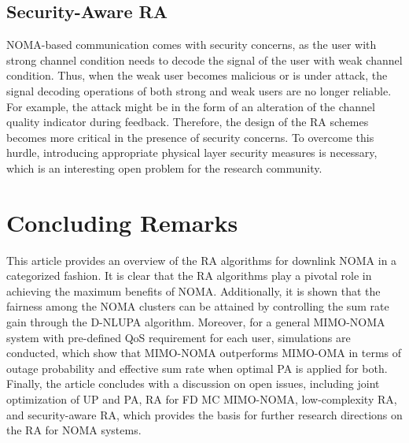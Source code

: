 \documentclass[10pt,final,journal,a4paper,twoside,twocolumn,romanappendices]{IEEEtran}
\theoremstyle{myremark}
\theoremstyle{myremark}
\begin{document}
\vspace{-0.2cm}
\subsection{Security-Aware RA}
NOMA-based communication comes with security concerns, as the user with strong channel condition needs to decode the signal of the user with weak channel condition. Thus, when the weak user becomes malicious or is under attack, the signal decoding operations of both strong and weak users are no longer reliable. For example, the attack might be in the form of an alteration of the channel quality indicator during feedback. Therefore, the design of the RA schemes becomes more critical in the presence of security concerns. To overcome this hurdle, introducing appropriate physical layer security measures is necessary, which is an interesting open problem for the research community.







\section{Concluding Remarks}
This article provides an overview of the RA algorithms for downlink NOMA in a categorized fashion. It is clear that the RA algorithms play a pivotal role in achieving the maximum benefits of NOMA. Additionally, it is shown that the fairness among the NOMA clusters can be attained by controlling the sum rate gain through the D-NLUPA algorithm. {\color{black}Moreover, for a general MIMO-NOMA system with pre-defined QoS requirement for each user, simulations are conducted, which show that MIMO-NOMA outperforms MIMO-OMA in terms of outage probability and effective sum rate when optimal PA is applied for both.} Finally, the article concludes with a discussion on open issues, including joint optimization of UP and PA, RA for FD MC MIMO-NOMA, low-complexity RA, and security-aware RA, which provides the basis for further research directions on the RA for NOMA systems.







\end{document}
